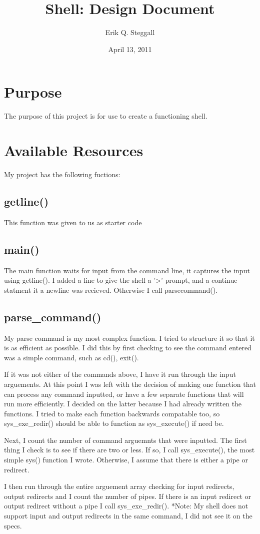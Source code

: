 \documentclass[a4paper, 12pt]{article}
\title{Shell: Design Document}
\date{April 13, 2011}
\author{Erik Q. Steggall}
\begin{document}
\section{Purpose}
The purpose of this project is for use to create a functioning shell. 

\section{Available Resources}
My project has the following fuctions:
\subsection{getline()}
This function was given to us as starter code
\subsection{main()}
The main function waits for input from the command line, it captures the input using getline(). I added a line to give the shell a '>' prompt, and a continue statment it a newline was recieved. Otherwise I call parsecommand().
\subsection{parse\_command()}
My parse command is my most complex function. I tried to structure it so that it is as efficient as possible. I did this by first checking to see the command entered was a simple command, such as cd(), exit().

If it was not either of the commands above, I have it run through the input arguements. At this point I was left with the decision of making one function that can process any command inputted, or have a few separate functions that will run more efficiently. I decided on the latter because I had already written the functions. I tried to make each function backwards compatable too, so sys\_exe\_redir() should be able to function as sys\_execute() if need be.

Next, I count the number of command arguemnts that were inputted. The first thing I check is to see if there are two or less. If so, I call sys\_execute(), the most simple sys() function I wrote. Otherwise, I assume that there is either a pipe or redirect.

I then run through the entire arguement array checking for input redirects, output redirects and I count the number of pipes. If there is an input redirect or output redirect without a pipe I call sys\_exe\_redir(). *Note: My shell does not support input and output redirects in the same command, I did not see it on the specs.
\end{document}
